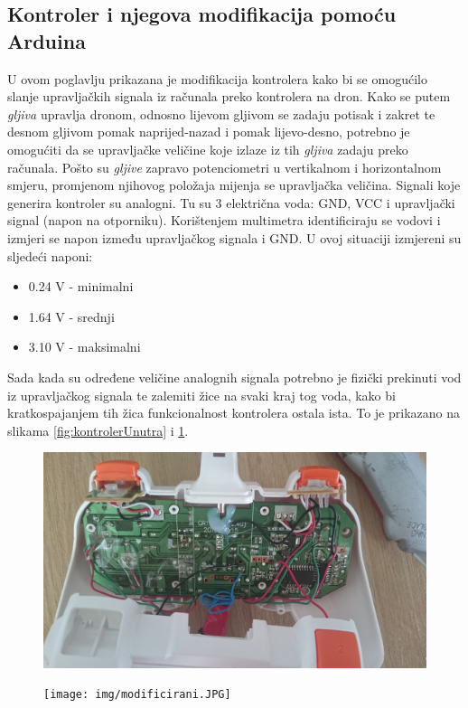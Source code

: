 \documentclass[times, utf8, diplomski]{fer}
\begin{document}
\subsection{Kontroler i njegova modifikacija pomoću Arduina}\label{sec:kontroler}
U ovom poglavlju prikazana je modifikacija kontrolera kako bi se omogućilo slanje upravljačkih signala iz računala preko kontrolera na dron. Kako se putem \emph{gljiva} upravlja dronom, odnosno lijevom gljivom se zadaju potisak  i zakret  te desnom gljivom pomak naprijed-nazad i pomak lijevo-desno, potrebno je omogućiti da se upravljačke veličine koje izlaze iz tih \emph{gljiva} zadaju preko računala. Pošto su \emph{gljive} zapravo potenciometri u vertikalnom i horizontalnom smjeru, promjenom njihovog položaja mijenja se  upravljačka veličina. Signali koje generira kontroler su analogni. Tu su 3 električna voda: GND, VCC i upravljački signal (napon na otporniku). Korištenjem multimetra identificiraju se vodovi i izmjeri se napon između upravljačkog signala i GND. U ovoj situaciji izmjereni su sljedeći naponi:
\begin{itemize}
\item 0.24 V - minimalni
\item 1.64 V - srednji
\item 3.10 V - maksimalni
\end{itemize}
Sada kada su određene veličine analognih signala potrebno je fizički prekinuti vod iz upravljačkog signala te zalemiti žice na svaki kraj tog voda, kako bi kratkospajanjem tih žica funkcionalnost kontrolera ostala ista.  To je prikazano na slikama  \ref{fig:kontrolerUnutra} i \ref{fig:kontrolerVani}.
\begin{figure}[htb]
\centering
\begin{minipage}{.6\textwidth}
  \centering
  \includegraphics[width=.8\linewidth]{img/modificiranje.JPG}
  \label{fig:kontrolerUnutra}
\end{minipage}%
\begin{minipage}{.4\textwidth}
  \centering
  \texttt{[image: img/modificirani.JPG]}
  \label{fig:kontrolerVani}
\end{minipage}
\end{figure}\\
\end{document}
